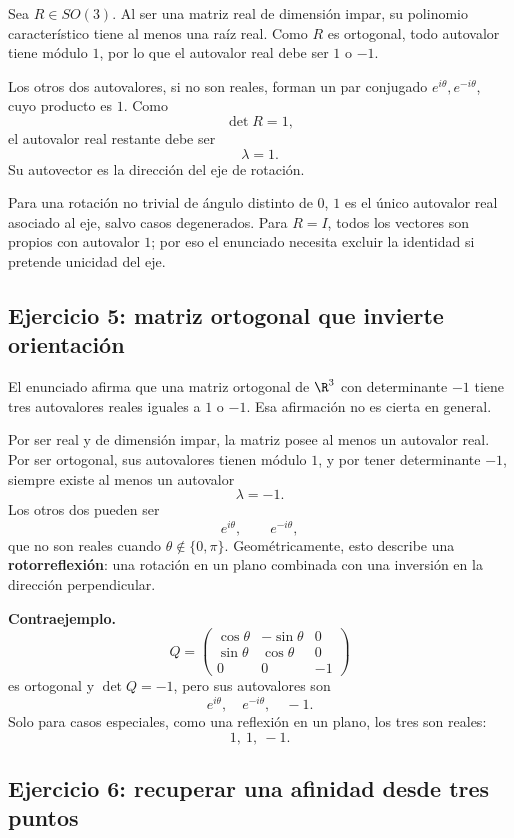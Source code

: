 Sea \(R\in SO(3)\). Al ser una matriz real de dimensión impar, su polinomio característico
tiene al menos una raíz real. Como \(R\) es ortogonal, todo autovalor tiene módulo \(1\), por
lo que el autovalor real debe ser \(1\) o \(-1\).

Los otros dos autovalores, si no son reales, forman un par conjugado
\(e^{i\theta},e^{-i\theta}\), cuyo producto es \(1\). Como
\[
  \det R=1,
\]
el autovalor real restante debe ser
\[
  \boxed{\lambda=1}.
\]
Su autovector es la dirección del eje de rotación.

\begin{atencion}
Para una rotación no trivial de ángulo distinto de \(0\), \(1\) es el único autovalor real
asociado al eje, salvo casos degenerados. Para \(R=I\), todos los vectores son propios con
autovalor \(1\); por eso el enunciado necesita excluir la identidad si pretende unicidad del
eje.
\end{atencion}

\subsection{Ejercicio 5: matriz ortogonal que invierte orientación}

El enunciado afirma que una matriz ortogonal de \(\R^3\) con determinante \(-1\) tiene tres
autovalores reales iguales a \(1\) o \(-1\). Esa afirmación no es cierta en general.

Por ser real y de dimensión impar, la matriz posee al menos un autovalor real. Por ser
ortogonal, sus autovalores tienen módulo \(1\), y por tener determinante \(-1\), siempre
existe al menos un autovalor
\[
  \boxed{\lambda=-1}.
\]
Los otros dos pueden ser
\[
  e^{i\theta},\qquad e^{-i\theta},
\]
que no son reales cuando \(\theta\notin\{0,\pi\}\). Geométricamente, esto describe una
\textbf{rotorreflexión}: una rotación en un plano combinada con una inversión en la dirección
perpendicular.

\textbf{Contraejemplo.}
\[
Q=
\begin{pmatrix}
\cos\theta&-\sin\theta&0\\
\sin\theta& \cos\theta&0\\
0&0&-1
\end{pmatrix}
\]
es ortogonal y \(\det Q=-1\), pero sus autovalores son
\[
  e^{i\theta},\quad e^{-i\theta},\quad -1.
\]
Solo para casos especiales, como una reflexión en un plano, los tres son reales:
\[
  1,\ 1,\ -1.
\]

\subsection{Ejercicio 6: recuperar una afinidad desde tres puntos}

